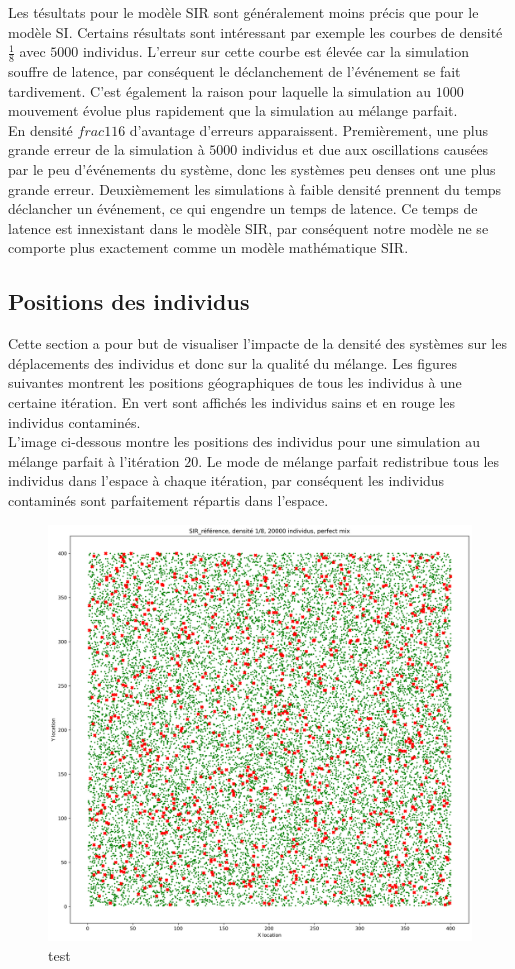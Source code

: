 Les tésultats pour le modèle SIR sont généralement moins précis que pour le modèle SI. Certains résultats sont intéressant par exemple les courbes de densité $\frac{1}{8}$ avec $5000$ individus. L'erreur sur cette courbe est élevée car la simulation souffre de latence, par conséquent le déclanchement de l'événement se fait tardivement. C'est également la raison pour laquelle la simulation au $1000$ mouvement évolue plus rapidement que la simulation au mélange parfait.\\

En densité $frac{1}{16}$ d'avantage d'erreurs apparaissent. Premièrement, une plus grande erreur de la simulation à $5000$ individus et due aux oscillations causées par le peu d'événements du système, donc les systèmes peu denses ont une plus grande erreur. Deuxièmement les simulations à faible densité prennent du temps déclancher un événement, ce qui engendre un temps de latence. Ce temps de latence est innexistant dans le modèle SIR, par conséquent notre modèle ne se comporte plus exactement comme un modèle mathématique SIR.

\subsection{Positions des individus}

Cette section a pour but de visualiser l'impacte de la densité des systèmes sur les déplacements des individus et donc sur la qualité du mélange. Les figures suivantes montrent les positions géographiques de tous les individus à une certaine itération. En vert sont affichés les individus sains et en rouge les individus contaminés.\\

L'image ci-dessous montre les positions des individus pour une simulation au mélange parfait à l'itération $20$. Le mode de mélange parfait redistribue tous les individus dans l'espace à chaque itération, par conséquent les individus contaminés sont parfaitement répartis dans l'espace.

\begin{figure}[h]
	\centering
	\captionsetup{justification=centering}
	\includegraphics[width=.7\textwidth]{Images/SIR_position_8_20_perfect_mix.png}
	\caption{test}
\end{figure}


